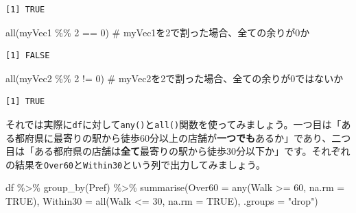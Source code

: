 \documentclass[
  a4paper,
  pandoc,
  ja=standard,
  jafont=haranoaji]{bxjsbook}
\newenvironment{Shaded}{\begin{snugshade}}{\end{snugshade}}
\newcommand{\AttributeTok}[1]{\textcolor[rgb]{0.00,0.48,0.65}{#1}}
\newcommand{\CommentTok}[1]{\textcolor[rgb]{0.37,0.37,0.37}{#1}}
\newcommand{\ConstantTok}[1]{\textcolor[rgb]{0.56,0.35,0.01}{#1}}
\newcommand{\DecValTok}[1]{\textcolor[rgb]{0.68,0.00,0.00}{#1}}
\newcommand{\FunctionTok}[1]{\textcolor[rgb]{0.28,0.35,0.67}{#1}}
\newcommand{\NormalTok}[1]{\textcolor[rgb]{0.00,0.48,0.65}{#1}}
\newcommand{\SpecialCharTok}[1]{\textcolor[rgb]{0.37,0.37,0.37}{#1}}
\newcommand{\StringTok}[1]{\textcolor[rgb]{0.13,0.47,0.30}{#1}}
\begin{document}
\begin{verbatim}
[1] TRUE
\end{verbatim}

\begin{Shaded}
\begin{Highlighting}[numbers=left,,]
\FunctionTok{all}\NormalTok{(myVec1 }\SpecialCharTok{\%\%} \DecValTok{2} \SpecialCharTok{==} \DecValTok{0}\NormalTok{) }\CommentTok{\# myVec1を2で割った場合、全ての余りが0か}
\end{Highlighting}
\end{Shaded}

\begin{verbatim}
[1] FALSE
\end{verbatim}

\begin{Shaded}
\begin{Highlighting}[numbers=left,,]
\FunctionTok{all}\NormalTok{(myVec2 }\SpecialCharTok{\%\%} \DecValTok{2} \SpecialCharTok{!=} \DecValTok{0}\NormalTok{) }\CommentTok{\# myVec2を2で割った場合、全ての余りが0ではないか}
\end{Highlighting}
\end{Shaded}

\begin{verbatim}
[1] TRUE
\end{verbatim}

それでは実際に\texttt{df}に対して\texttt{any()}と\texttt{all()}関数を使ってみましょう。一つ目は「ある都府県に最寄りの駅から徒歩60分以上の店舗が\textbf{一つでも}あるか」であり、二つ目は「ある都府県の店舗は\textbf{全て}最寄りの駅から徒歩30分以下か」です。それぞれの結果を\texttt{Over60}と\texttt{Within30}という列で出力してみましょう。

\begin{Shaded}
\begin{Highlighting}[numbers=left,,]
\NormalTok{df }\SpecialCharTok{\%\textgreater{}\%}
  \FunctionTok{group\_by}\NormalTok{(Pref) }\SpecialCharTok{\%\textgreater{}\%}
  \FunctionTok{summarise}\NormalTok{(}\AttributeTok{Over60   =} \FunctionTok{any}\NormalTok{(Walk }\SpecialCharTok{\textgreater{}=} \DecValTok{60}\NormalTok{, }\AttributeTok{na.rm =} \ConstantTok{TRUE}\NormalTok{),}
            \AttributeTok{Within30 =} \FunctionTok{all}\NormalTok{(Walk }\SpecialCharTok{\textless{}=} \DecValTok{30}\NormalTok{, }\AttributeTok{na.rm =} \ConstantTok{TRUE}\NormalTok{),}
            \AttributeTok{.groups  =} \StringTok{"drop"}\NormalTok{)}
\end{Highlighting}
\end{Shaded}
\end{document}
